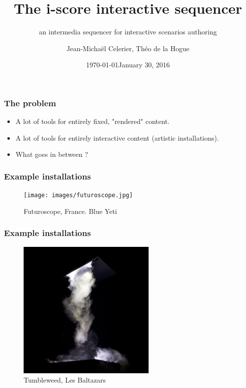 \documentclass{beamer}
\title{The i-score interactive sequencer}
\subtitle{an intermedia sequencer for interactive scenarios authoring}
\date{\today}
\author{Jean-Michaël Celerier, Théo de la Hogue}
\institute{LaBRI, Blue Yeti, GMEA }
\date{January 30, 2016}
\begin{document}
    
\maketitle

\begin{frame}
    \frametitle{The problem}    
    \Large
    \begin{itemize}
    	\item A lot of tools for entirely fixed, "rendered" content.
    	\item A lot of tools for entirely interactive content (artistic installations).
    	\item What goes in between ?    	
    \end{itemize}    
\end{frame}

\begin{frame}
    \frametitle{Example installations}        

    \begin{figure}
        \centering
        \texttt{[image: images/futuroscope.jpg]}
        \caption{Futuroscope, France. Blue Yeti}
    \end{figure}
\end{frame}


\begin{frame}
    \frametitle{Example installations}       
    
    \begin{figure}
    	\centering
    	\includegraphics[width=0.6\textwidth]{images/tumbleweed.jpg}
    	\caption{Tumbleweed, Les Baltazars}
    \end{figure}
\end{frame}
\end{document}

